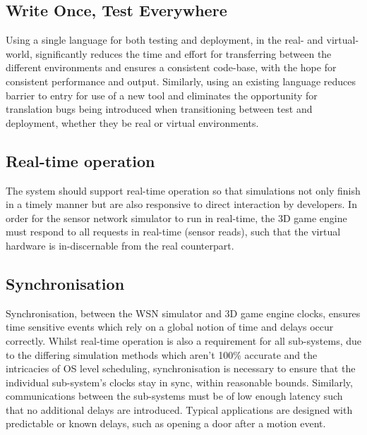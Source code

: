 
\subsection{Write Once, Test Everywhere}
\label{sub:requirements_real_code}
Using a single language for both testing and deployment, in the real- and virtual-world, significantly reduces the time and effort for transferring between the different environments and ensures a consistent code-base, with the hope for consistent performance and output. Similarly, using an existing language reduces barrier to entry for use of a new tool and eliminates the opportunity for translation bugs being introduced when transitioning between test and deployment, whether they be real or virtual environments.

\subsection{Real-time operation}
\label{sub:requirements_real-time_operation}
The system should support real-time operation so that simulations not only finish in a timely manner but are also responsive to direct interaction by developers. In order for the sensor network simulator to run in real-time, the 3D game engine must respond to all requests in real-time (sensor reads), such that the virtual hardware is in-discernable from the real counterpart.

\subsection{Synchronisation}
\label{sub:requirements_synchronisation}
Synchronisation, between the WSN simulator and 3D game engine clocks, ensures time sensitive events which rely on a global notion of time and delays occur correctly. Whilst real-time operation is also a requirement for all sub-systems, due to the differing simulation methods which aren't 100\% accurate and the intricacies of OS level scheduling, synchronisation is necessary to ensure that the individual sub-system's clocks stay in sync, within reasonable bounds. Similarly, communications between the sub-systems must be of low enough latency such that no additional delays are introduced. Typical applications are designed with predictable or known delays, such as opening a door after a motion event.

